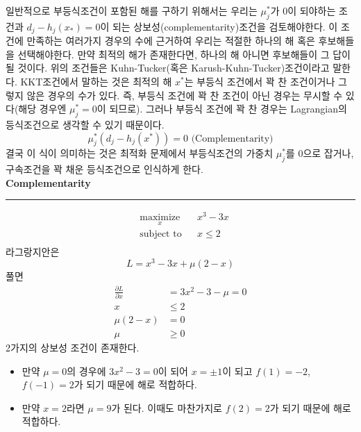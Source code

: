 일반적으로 부등식조건이 포함된 해를 구하기 위해서는 우리는 $\mu_{j}^{*}$가 0이 되야하는 조건과 $d_{j}-h_{j}(x_{*})=0$이 되는 상보성(complementarity)조건을 검토해야한다. 이 조건에 만족하는 여러가지 경우의 수에 근거하여 우리는 적절한 하나의 해 혹은 후보해들을 선택해야한다. 만약 최적의 해가 존재한다면, 하나의 해 아니면 후보해들이 그 답이 될 것이다. 위의 조건들은 Kuhn-Tucker(혹은 Karush-Kuhn-Tucker)조건이라고 말한다. KKT조건에서 말하는 것은 최적의 해 $x^{*}$는 부등식 조건에서 꽉 찬 조건이거나 그렇지 않은 경우의 수가 있다. 즉, 부등식 조건에 꽉 찬 조건이 아닌 경우는 무시할 수 있다(해당 경우엔 $\mu_{j}^{*}=0$이 되므로). 그러나 부등식 조건에 꽉 찬 경우는 Lagrangian의 등식조건으로 생각할 수 있기 때문이다.
\begin{equation*}
\mu_{j}^{*}\left(d_{j}-h_{j}(x^{*})\right)=0\text{ (Complementarity)}
\end{equation*}
결국 이 식이 의미하는 것은 최적화 문제에서 부등식조건의 가중치 $\mu_{j}^{*}$를 0으로 잡거나, 구속조건을 꽉 채운 등식조건으로 인식하게 한다.
\\
 \textbf{Complementarity}\\
\rule{\textwidth}{0.1pt}
\begin{equation*}
\begin{aligned}
& \underset{x}{\text{maximize}}& & x^{3}-3x\\
& \text{subject to}& & x\leq2\\
\end{aligned}
\end{equation*}
라그랑지안은
\begin{equation*}
L=x^{3}-3x+\mu(2-x)
\end{equation*}
풀면
\begin{align*}
\frac{\partial L}{\partial x}&=3x^{2}-3-\mu=0\\
x&\leq2\\
\mu(2-x)&=0\\
\mu&\geq0
\end{align*}
2가지의 상보성 조건이 존재한다.
\begin{itemize}
\item 만약 $\mu=0$의 경우에 $3x^{2}-3=0$이 되어 $x=\pm1$이 되고 $f(1)=-2$, $f(-1)=2$가 되기 때문에 해로 적합하다. 
\item 만약 $x=2$라면 $\mu=9$가 된다. 이때도 마찬가지로 $f(2)=2$가 되기 때문에 해로 적합하다.
\end{itemize}
